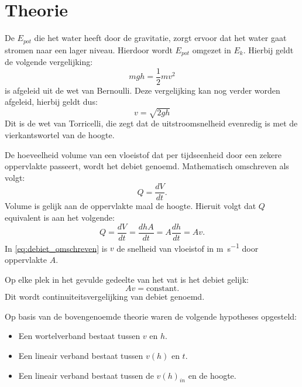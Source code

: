 \documentclass[numbers=endperiod]{scrartcl}
\begin{document}
\section{Theorie}

De $E_{pot}$ die het water heeft door de gravitatie, zorgt ervoor dat het water gaat stromen naar een lager niveau. Hierdoor wordt $E_{pot}$ omgezet in $E_{k}$. Hierbij geldt de volgende vergelijking:
\begin{equation}\label{eq:som}
mgh = \frac{1}{2} mv^2
\end{equation}
 is afgeleid uit de wet van Bernoulli. Deze vergelijking kan nog verder worden afgeleid, hierbij geldt dus:
\begin{equation}\label{torricelli}
v = \sqrt{2gh}
\end{equation}
Dit is de wet van Torricelli, die zegt dat de uitstroomsnelheid evenredig is met de vierkantswortel van de hoogte.

De hoeveelheid volume van een vloeistof dat per tijdseenheid door een zekere oppervlakte passeert, wordt het debiet genoemd. Mathematisch omschreven als volgt:
\begin{equation}\label{eq:debiet}
    Q = \frac{dV}{dt}.
\end{equation}
Volume is gelijk aan de oppervlakte maal de hoogte. Hieruit volgt dat $Q$ equivalent is aan het volgende:
\begin{equation}\label{eq:debiet_omschreven}
    Q = \frac{dV}{dt} = \frac{dhA}{dt} = A\frac{dh}{dt} = Av.
\end{equation}
In \cref{eq:debiet_omschreven} is $v$ de snelheid van vloeistof in \si{\meter\per\second} door oppervlakte $A$.

Op elke plek in het gevulde gedeelte van het vat is het debiet gelijk: 
\begin{equation}\label{eq:constant_debiet}
    Av = \text{constant}.
\end{equation}
Dit wordt continuiteitsvergelijking van debiet genoemd.

Op basis van de bovengenoemde theorie waren de volgende hypotheses opgesteld:
\begin{itemize}
 \renewcommand{\labelitemi}{\scriptsize$\blacksquare$}
    \item Een wortelverband bestaat tussen $v$ en $h$.
    \item Een lineair verband bestaat tussen $v(h)$ en $t$.
    \item Een lineair verband bestaat tussen de $v(h)_{in}$ en de hoogte. 
\end{itemize}
\end{document}
